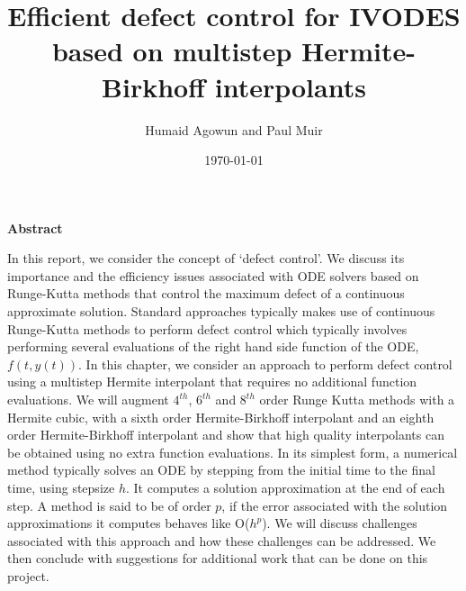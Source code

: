 \documentclass{article}
\begin{document}
\begin{titlepage}
\author{Humaid Agowun and Paul Muir} 
\title{Efficient defect control for IVODES based on multistep Hermite-Birkhoff interpolants
} 
\date{\today} 
\maketitle
\end{titlepage}

\begin{center}
    \textbf{Abstract}
\end{center}

In this report, we consider the concept of `defect control'. We discuss its importance and the efficiency issues associated with ODE solvers based on Runge-Kutta methods \cite{MR3822086} that control the maximum defect of a continuous approximate solution. Standard approaches typically makes use of continuous Runge-Kutta methods \cite{MR3822086} to perform defect control which typically involves performing several evaluations of the right hand side function of the ODE, $f(t, y(t))$. In this chapter, we consider an approach to perform defect control using a multistep Hermite interpolant \cite{MR3822086} that requires no additional function evaluations. We will augment $4^{th}$, $6^{th}$ and $8^{th}$ order Runge Kutta methods with a Hermite cubic, with a sixth order Hermite-Birkhoff interpolant and an eighth order Hermite-Birkhoff interpolant and show that high quality interpolants can be obtained using no extra function evaluations. In its simplest form, a numerical method typically solves an ODE by stepping from the initial time to the final time, using stepsize $h$. It computes a solution approximation at the end of each step. A method is said to be of order $p$, if the error associated with the solution approximations it computes behaves like O($h^p$). We will discuss challenges associated with this approach and how these challenges can be addressed. We then conclude with suggestions for additional work that can be done on this project.





 









\end{document}
